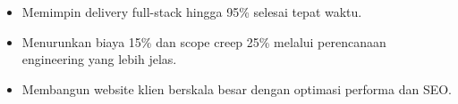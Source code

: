 \begin{itemize}
\item Memimpin delivery full-stack hingga 95\% selesai tepat waktu.
\item Menurunkan biaya 15\% dan scope creep 25\% melalui perencanaan engineering yang lebih jelas.
\end{itemize}
\divider

\begin{itemize}
\item Membangun website klien berskala besar dengan optimasi performa dan SEO.
\end{itemize}

\newpage
\switchcolumn
